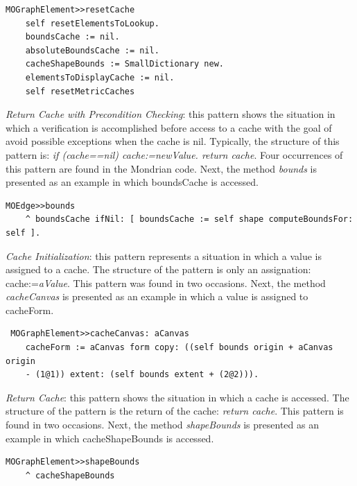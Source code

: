 \documentclass[runningheads]{llncs}
\begin{document}
\begin{lstlisting} 
MOGraphElement>>resetCache 
	self resetElementsToLookup.
	boundsCache := nil. 
	absoluteBoundsCache := nil. 
	cacheShapeBounds := SmallDictionary new. 
	elementsToDisplayCache := nil. 
	self resetMetricCaches
\end{lstlisting}

\emph{Return Cache with Precondition Checking}: this pattern shows
the situation in which a verification is accomplished before access
to a cache with the goal of avoid possible exceptions when the cache
is nil. Typically, the structure of this pattern is: \emph{if (cache==nil)
cache:=newValue. return cache}. Four occurrences of this pattern are
found in the Mondrian code. Next, the method \emph{bounds} is presented
as an example in which boundsCache is accessed.

\begin{lstlisting}
MOEdge>>bounds
	^ boundsCache ifNil: [ boundsCache := self shape computeBoundsFor: self ].
\end{lstlisting}

\emph{Cache Initialization}: this pattern represents a situation in
which a value is assigned to a cache. The structure of the pattern
is only an assignation: cache:=\emph{aValue}. This pattern was found
in two occasions. Next, the method \emph{cacheCanvas} is presented
as an example in which a value is assigned to cacheForm.

\begin{lstlisting}
 MOGraphElement>>cacheCanvas: aCanvas 
	cacheForm := aCanvas form copy: ((self bounds origin + aCanvas origin 
	- (1@1)) extent: (self bounds extent + (2@2))). 
\end{lstlisting}

\emph{Return Cache}: this pattern shows the situation in which a cache
is accessed. The structure of the pattern is the return of the cache:
\emph{return cache}. This pattern is found in two occasions. Next,
the method \emph{shapeBounds} is presented as an example in which
cacheShapeBounds is accessed.

\begin{lstlisting} 
MOGraphElement>>shapeBounds 
	^ cacheShapeBounds 
\end{lstlisting}
\end{document}
